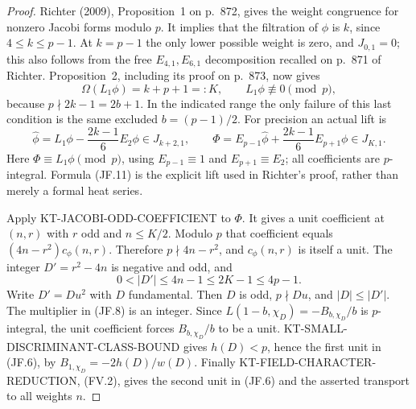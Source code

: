 \documentclass[11pt,a4paper]{article}
\theoremstyle{definition}
\begin{document}
\begin{proof}
Richter (2009), Proposition~1 on p.~872, gives the weight
congruence for nonzero Jacobi forms modulo $p$.
It implies that the filtration of $\phi$ is $k$, since
$4\leq k\leq p-1$.  At $k=p-1$ the only lower possible weight
is zero, and $J_{0,1}=0$; this also follows from the free
$E_{4,1},E_{6,1}$ decomposition recalled on p.~871 of Richter.
Proposition~2, including its proof on p.~873, now gives
\[
 \Omega(L_1\phi)=k+p+1=:K,\qquad L_1\phi\not\equiv0\pmod p,
                                                               \tag{JF.10}
\]
because $p\nmid 2k-1=2b+1$.  In the indicated range the only
failure of this last condition is the same excluded $b=(p-1)/2$.
For precision an actual lift is
\[
 \widehat\phi=L_1\phi-\frac{2k-1}{6}E_2\phi\in J_{k+2,1},
 \qquad
 \Phi=E_{p-1}\widehat\phi+
                   \frac{2k-1}{6}E_{p+1}\phi\in J_{K,1}.
                                                               \tag{JF.11}
\]
Here $\Phi\equiv L_1\phi\pmod p$, using
$E_{p-1}\equiv1$ and $E_{p+1}\equiv E_2$; all coefficients
are $p$-integral.  Formula (JF.11) is the explicit lift used in
Richter's proof, rather than merely a formal heat series.

Apply KT-JACOBI-ODD-COEFFICIENT to $\Phi$.  It gives a unit
coefficient at $(n,r)$ with $r$ odd and $n\leq K/2$.
Modulo $p$ that coefficient equals
$(4n-r^2)c_\phi(n,r)$.  Therefore $p\nmid4n-r^2$, and
$c_\phi(n,r)$ is itself a unit.  The integer
$D'=r^2-4n$ is negative and odd, and
\[
                    0<|D'|\leq4n-1\leq2K-1\leq4p-1.
                                                               \tag{JF.12}
\]
Write $D'=Du^2$ with $D$ fundamental.  Then $D$ is odd,
$p\nmid Du$, and $|D|\leq|D'|$.
The multiplier in (JF.8) is an integer.  Since
$L(1-b,\chi_D)=-B_{b,\chi_D}/b$ is $p$-integral,
the unit coefficient forces $B_{b,\chi_D}/b$ to be a unit.
KT-SMALL-DISCRIMINANT-CLASS-BOUND gives $h(D)<p$, hence the
first unit in (JF.6), by $B_{1,\chi_D}=-2h(D)/w(D)$.
Finally KT-FIELD-CHARACTER-REDUCTION, (FV.2), gives the second
unit in (JF.6) and the asserted transport to all weights $n$.
\end{proof}
\end{document}
